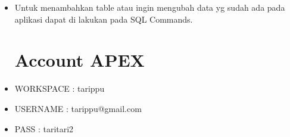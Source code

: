 \begin{itemize}
    \item Untuk menambahkan table atau ingin mengubah data yg sudah ada pada aplikasi dapat di lakukan pada SQL Commands. 
    
    \section{Account APEX}
    \item WORKSPACE : tarippu
    \item USERNAME  : tarippu@gmail.com
    \item PASS      : taritari2
\end{itemize}
